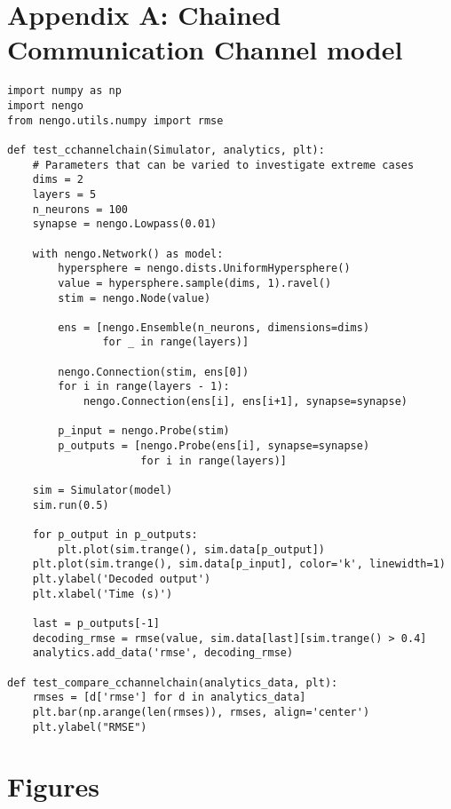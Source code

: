 \documentclass{frontiersSCNS}
\begin{document}



\clearpage

\section*{Appendix A: Chained Communication Channel model}

\begin{lstlisting}
import numpy as np
import nengo
from nengo.utils.numpy import rmse

def test_cchannelchain(Simulator, analytics, plt):
    # Parameters that can be varied to investigate extreme cases
    dims = 2
    layers = 5
    n_neurons = 100
    synapse = nengo.Lowpass(0.01)

    with nengo.Network() as model:
        hypersphere = nengo.dists.UniformHypersphere()
        value = hypersphere.sample(dims, 1).ravel()
        stim = nengo.Node(value)

        ens = [nengo.Ensemble(n_neurons, dimensions=dims)
               for _ in range(layers)]

        nengo.Connection(stim, ens[0])
        for i in range(layers - 1):
            nengo.Connection(ens[i], ens[i+1], synapse=synapse)

        p_input = nengo.Probe(stim)
        p_outputs = [nengo.Probe(ens[i], synapse=synapse)
                     for i in range(layers)]

    sim = Simulator(model)
    sim.run(0.5)

    for p_output in p_outputs:
        plt.plot(sim.trange(), sim.data[p_output])
    plt.plot(sim.trange(), sim.data[p_input], color='k', linewidth=1)
    plt.ylabel('Decoded output')
    plt.xlabel('Time (s)')

    last = p_outputs[-1]
    decoding_rmse = rmse(value, sim.data[last][sim.trange() > 0.4]
    analytics.add_data('rmse', decoding_rmse)

def test_compare_cchannelchain(analytics_data, plt):
    rmses = [d['rmse'] for d in analytics_data]
    plt.bar(np.arange(len(rmses)), rmses, align='center')
    plt.ylabel("RMSE")
\end{lstlisting}

\clearpage

\section*{Figures}
\end{document}
